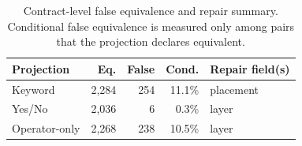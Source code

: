 \begin{table}[H]
\centering
\caption{Contract-level false equivalence and repair summary. Conditional false equivalence is measured only among pairs that the projection declares equivalent.}
\label{tab:false-equivalence}
\small
\begin{tabular}{lrrrl}
\toprule
Projection & Eq. & False & Cond. & Repair field(s) \\
\midrule
Keyword & 2,284 & 254 & 11.1\% & placement \\
Yes/No & 2,036 & 6 & 0.3\% & layer \\
Operator-only & 2,268 & 238 & 10.5\% & layer \\
\bottomrule
\end{tabular}
\end{table}
